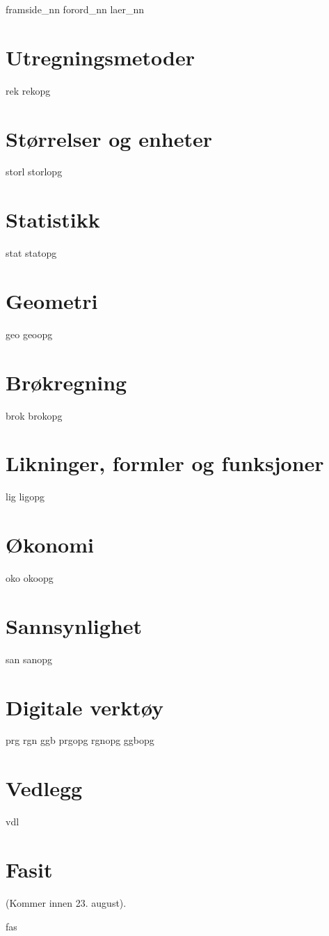 




{framside_nn}
{forord_nn}
{laer_nn}

\tableofcontents
\chapter{Utregningsmetoder}
\newpage
{rek}
{rekopg}

\chapter{Størrelser og enheter}
\newpage
{storl}
\opgt
{storlopg}

\chapter{Statistikk}
\newpage
{stat}
{statopg}

\chapter{Geometri}
\newpage
{geo}
{geoopg}

\chapter{Brøkregning \label{Br}}
\newpage
{brok}
\newpage
{brokopg}

\chapter{Likninger, formler og funksjoner \label{Lig}}
\newpage
{lig}
{ligopg}

\chapter{Økonomi \label{Oko}}
\newpage
{oko}
{okoopg}

\chapter{Sannsynlighet \label{San}} 
\newpage
{san}
{sanopg}

\chapter{Digitale verktøy}
\newpage
{prg}
{rgn}	
{ggb}	
\opgt
{prgopg}
{rgnopg}	
{ggbopg}	

\chapter*{Vedlegg} 
\newpage
{}
{vdl}


\chapter*{Fasit}
(Kommer innen 23. august).

{fas}






